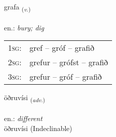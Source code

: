 \documentclass[frontgrid, backgrid]{flacards}\usepackage[]{graphicx}\usepackage[]{xcolor}
\begin{document}
\renewcommand{\flhead}{\vskip5pt \fboxsep=0pt {\small\bfseries\footnotesize Sagnorð | Verb}}
\renewcommand{\fcfoot}{\vskip5pt \fboxsep=0pt \hspace{2pt}{\small\bfseries\footnotesize 2K}}

\renewcommand{\blhead}{\vskip5pt {\small\bfseries\footnotesize Sagnorð | Verb }}
\renewcommand{\bcfoot}{\vskip5pt \hspace{2pt}{\small\bfseries\footnotesize 2K}}


{grafa \small{\textsubscript{(\textit{v.})}} \\[1ex] %
\textphonetic{[kraːva]} \\
en.: \emph{bury; dig} \\  [2ex]
\renewcommand*{\arraystretch}{0.8}
\begin{tabular}{p{1cm}l}
\textsc{1sg}: & gref -- gróf -- grafið \\ 
\textsc{2sg}: & grefur -- grófst -- grafið \\ 
\textsc{3sg}: & grefur -- gróf -- grafið \\ 
\end{tabular}
}


\renewcommand{\flhead}{\vskip5pt \fboxsep=0pt {\small\bfseries\footnotesize Atviksorð | Adverb}}
\renewcommand{\fcfoot}{\vskip5pt \fboxsep=0pt \hspace{2pt}{\small\bfseries\footnotesize 2K}}

\renewcommand{\blhead}{\vskip5pt {\small\bfseries\footnotesize Atviksorð | Adverb }}
\renewcommand{\bcfoot}{\vskip5pt \hspace{2pt}{\small\bfseries\footnotesize 2K}}


{öðruvísi \small{\textsubscript{(\textit{adv.})}} \\[1ex]
\textphonetic{[œðrʏvisɪ]} \\
en.: \emph{different} \\  [2ex]
öðruvísi (Indeclinable)}

\renewcommand{\flhead}{\vskip5pt \fboxsep=0pt {\small\bfseries\footnotesize Sagnorð | Verb}}
\renewcommand{\fcfoot}{\vskip5pt \fboxsep=0pt \hspace{2pt}{\small\bfseries\footnotesize 2K}}
\end{document}

